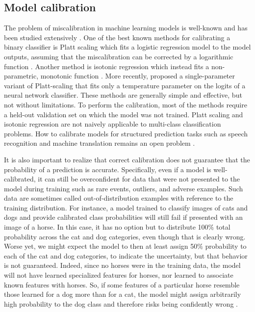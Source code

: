 \subsection{Model calibration}
% 
The problem of miscalibration in machine learning models is well-known and has been studied extensively \cite{lewis_sequential_1995, platt_probabilistic_1999, garczarek_classification_2002, zadrozny_transforming_2002, bennett_using_2003}. One of the best known methods for calibrating a binary classifier is Platt scaling which fits a logistic regression model to the model outputs, assuming that the miscalibration can be corrected by a logarithmic function \cite{platt_probabilistic_1999}. Another method is isotonic regression which instead fits a non-parametric, monotonic function \cite{zadrozny_transforming_2002}. 
More recently, \textcite{guo_calibration_2017} proposed a single-parameter variant of Platt-scaling that fits only a temperature parameter on the logits of a neural network classifier. 
These methods are generally simple and effective, but not without limitations. 
To perform the calibration, most of the methods require a held-out validation set on which the model was not trained. Platt scaling and isotonic regression are not naively applicable to multi-class classification problems. How to calibrate models for structured prediction tasks such as speech recognition and machine translation remains an open problem \cite{astudillo_uncertainty_2010, astudillo_integration_2013, jayashankar_detecting_2020}.

It is also important to realize that correct calibration does not guarantee that the probability of a prediction is accurate. 
Specifically, even if a model is well-calibrated, it can still be overconfident for data that were not presented to the model during training such as rare events, outliers, and adverse examples. Such data are sometimes called out-of-distribution examples with reference to the training distribution. 
For instance, a model trained to classify images of cats and dogs and provide calibrated class probabilities will still fail if presented with an image of a horse. In this case, it has no option but to distribute 100\% total probability across the cat and dog categories, even though that is clearly wrong. 
Worse yet, we might expect the model to then at least assign 50\% probability to each of the cat and dog categories, to indicate the uncertainty, but that behavior is not guaranteed. Indeed, since no horses were in the training data, the model will not have learned specialized features for horses, nor learned to associate known features with horses. So, if some features of a particular horse resemble those learned for a dog more than for a cat, the model might assign arbitrarily high probability to the dog class and therefore risks being confidently wrong \cite{zhou_survey_2022}. 



